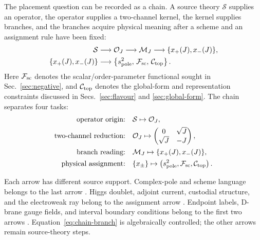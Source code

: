 The placement question can be recorded as a chain.  A source theory \(\mathcal S\) supplies an operator, the operator supplies a two-channel kernel, the kernel supplies branches, and the branches acquire physical meaning after a scheme and an assignment rule have been fixed:
\begin{equation}
\begin{aligned}
\mathcal S
&\longrightarrow
\mathcal O_J
\longrightarrow
\mathcal M_J
\longrightarrow
\{x_+(J),x_-(J)\},
\\
\{x_+(J),x_-(J)\}
&\longrightarrow
\left\{
s^2_{\rm pole},\,
\mathcal F_{\rm sc},\,
\mathcal C_{\rm top}
\right\}.
\end{aligned}
\label{eq:placement-chain}
\end{equation}
Here \(\mathcal F_{\rm sc}\) denotes the scalar/order-parameter functional sought in Sec.~\ref{sec:negative}, and \(\mathcal C_{\rm top}\) denotes the global-form and representation constraints discussed in Secs.~\ref{sec:flavour} and \ref{sec:global-form}.  The chain separates four tasks:
\begin{align}
  \text{operator origin:}\quad&
  \mathcal S\mapsto \mathcal O_J,
  \label{eq:chain-origin}\\
  \text{two-channel reduction:}\quad&
  \mathcal O_J\mapsto
  \begin{pmatrix}0&\sqrt J\\ \sqrt J&-J\end{pmatrix},
  \label{eq:chain-reduction}\\
  \text{branch reading:}\quad&
  \mathcal M_J\mapsto \{x_+(J),x_-(J)\},
  \label{eq:chain-branch}\\
  \text{physical assignment:}\quad&
  \{x_\pm\}\mapsto
  \left(s^2_{\rm pole},\mathcal F_{\rm sc},\mathcal C_{\rm top}\right).
  \label{eq:chain-assignment}
\end{align}

Each arrow has different source support.  Complex-pole and scheme language belongs to the last arrow \cite{MartinRobertson2025}.  Higgs doublet, adjoint current, custodial structure, and the electroweak ray belong to the assignment arrow \cite{Logan2022,Dawson2018}.  Endpoint labels, D-brane gauge fields, and interval boundary conditions belong to the first two arrows \cite{TongString,Polchinski1994,CsakiHubiszMeade2005}.  Equation~\eqref{eq:chain-branch} is algebraically controlled; the other arrows remain source-theory steps.

